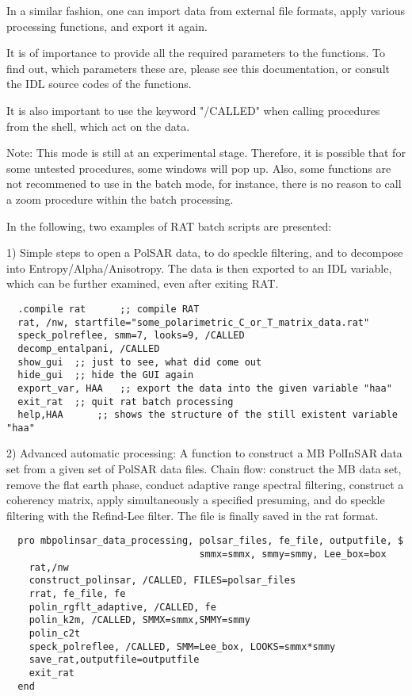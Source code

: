 In a similar fashion, one can import data from external file formats, apply
various processing functions, and export it again.

It is of importance to provide all the required parameters to the functions. To
find out, which parameters these are, please see this documentation, or consult
the IDL source codes of the functions.

It is also important to use the keyword "/CALLED" when calling procedures from
the shell, which act on the data.

Note: This mode is still at an experimental stage. Therefore, it is possible
that for some untested procedures, some windows will pop up. Also, some
functions are not recommened to use in the batch mode, for instance, there is no
reason to call a zoom procedure within the batch processing.

In the following, two examples of RAT batch scripts are presented:

1) Simple steps to open a PolSAR data, to do speckle filtering, and to decompose
into Entropy/Alpha/Anisotropy. The data is then exported to an IDL variable,
which can be further examined, even after exiting RAT.


\begin{verbatim}
  .compile rat		;; compile RAT
  rat, /nw, startfile="some_polarimetric_C_or_T_matrix_data.rat"
  speck_polreflee, smm=7, looks=9, /CALLED
  decomp_entalpani, /CALLED
  show_gui	;; just to see, what did come out
  hide_gui	;; hide the GUI again
  export_var, HAA  	;; export the data into the given variable "haa"
  exit_rat	;; quit rat batch processing
  help,HAA  	;; shows the structure of the still existent variable "haa"
\end{verbatim}

2) Advanced automatic processing: A function to construct a MB PolInSAR data set
from a given set of PolSAR data files. Chain flow: construct the MB data set,
remove the flat earth phase, conduct adaptive range spectral filtering,
construct a coherency matrix, apply simultaneously a specified presuming, and do
speckle filtering with the Refind-Lee filter. The file is finally saved in the
rat format.


\begin{verbatim}
  pro mbpolinsar_data_processing, polsar_files, fe_file, outputfile, $
                                  smmx=smmx, smmy=smmy, Lee_box=box
    rat,/nw
    construct_polinsar, /CALLED, FILES=polsar_files
    rrat, fe_file, fe
    polin_rgflt_adaptive, /CALLED, fe
    polin_k2m, /CALLED, SMMX=smmx,SMMY=smmy
    polin_c2t
    speck_polreflee, /CALLED, SMM=Lee_box, LOOKS=smmx*smmy
    save_rat,outputfile=outputfile
    exit_rat
  end
\end{verbatim}

